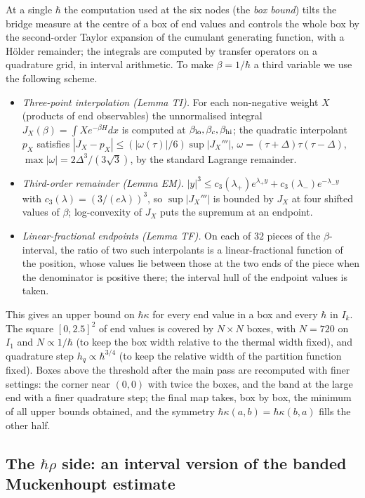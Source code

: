 \documentclass[11pt,a4paper]{article}
\theoremstyle{definition}
\theoremstyle{remark}
\newcommand{\hk}{\hbar\kappa}
\begin{document}
At a single $\hbar$ the computation used at the six nodes (the \emph{box bound}) tilts the bridge measure at the centre of a box of end values and controls the whole box by the second-order Taylor expansion of the cumulant generating function, with a Hölder remainder; the integrals are computed by transfer operators on a quadrature grid, in interval arithmetic. To make $\beta=1/\hbar$ a third variable we use the following scheme.
\begin{itemize}[leftmargin=2em]
\item \emph{Three-point interpolation (Lemma TI).} For each non-negative weight $X$ (products of end observables) the unnormalised integral $J_X(\beta)=\int Xe^{-\beta H}dx$ is computed at $\beta_{\rm lo},\beta_c,\beta_{\rm hi}$; the quadratic interpolant $p_X$ satisfies $|J_X-p_X|\le(|\omega(\tau)|/6)\sup|J_X'''|$, $\omega=(\tau+\Delta)\tau(\tau-\Delta)$, $\max|\omega|=2\Delta^3/(3\sqrt3)$, by the standard Lagrange remainder.
\item \emph{Third-order remainder (Lemma EM).} $|y|^3\le c_3(\lambda_+)e^{\lambda_+y}+c_3(\lambda_-)e^{-\lambda_-y}$ with $c_3(\lambda)=(3/(e\lambda))^3$, so $\sup|J_X'''|$ is bounded by $J_X$ at four shifted values of $\beta$; log-convexity of $J_X$ puts the supremum at an endpoint.
\item \emph{Linear-fractional endpoints (Lemma TF).} On each of $32$ pieces of the $\beta$-interval, the ratio of two such interpolants is a linear-fractional function of the position, whose values lie between those at the two ends of the piece when the denominator is positive there; the interval hull of the endpoint values is taken.
\end{itemize}
This gives an upper bound on $\hk$ for every end value in a box and every $\hbar$ in $I_k$. The square $[0,2.5]^2$ of end values is covered by $N\times N$ boxes, with $N=720$ on $I_1$ and $N\propto1/\hbar$ (to keep the box width relative to the thermal width fixed), and quadrature step $h_q\propto\hbar^{3/4}$ (to keep the relative width of the partition function fixed). Boxes above the threshold after the main pass are recomputed with finer settings: the corner near $(0,0)$ with twice the boxes, and the band at the large end with a finer quadrature step; the final map takes, box by box, the minimum of all upper bounds obtained, and the symmetry $\hk(a,b)=\hk(b,a)$ fills the other half.

\subsection{The \texorpdfstring{$\hbar\rho$}{hbar rho} side: an interval version of the banded Muckenhoupt estimate}\label{sec:hr}
\end{document}

